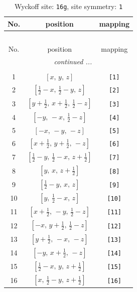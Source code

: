 \documentclass[fleqn,8pt]{jsarticle}
\begin{document}
\begin{longtable}{ccc}
\caption{Wyckoff site: {\tt 16g}, site symmetry: {\tt 1}}
 \\
 \hline \hline
No. & position & mapping \\ \hline \endfirsthead

\multicolumn{2}{l}{\tablename\ \thetable{}} \\
 \hline \hline
No. & position & mapping \\ \hline \endhead

 \hline \hline
\multicolumn{2}{r}{\footnotesize\it continued ...} \\ \endfoot

 \hline \hline
\multicolumn{2}{r}{} \\ \endlastfoot

1 & $\left[ x,\, y,\, z \right]$ & {\tt [1]} \\ \hline
2 & $\left[ \frac{1}{2} - x,\, \frac{1}{2} - y,\, z \right]$ & {\tt [2]} \\ \hline
3 & $\left[ y + \frac{1}{2},\, x + \frac{1}{2},\, \frac{1}{2} - z \right]$ & {\tt [3]} \\ \hline
4 & $\left[ - y,\, - x,\, \frac{1}{2} - z \right]$ & {\tt [4]} \\ \hline
5 & $\left[ - x,\, - y,\, - z \right]$ & {\tt [5]} \\ \hline
6 & $\left[ x + \frac{1}{2},\, y + \frac{1}{2},\, - z \right]$ & {\tt [6]} \\ \hline
7 & $\left[ \frac{1}{2} - y,\, \frac{1}{2} - x,\, z + \frac{1}{2} \right]$ & {\tt [7]} \\ \hline
8 & $\left[ y,\, x,\, z + \frac{1}{2} \right]$ & {\tt [8]} \\ \hline
9 & $\left[ \frac{1}{2} - y,\, x,\, z \right]$ & {\tt [9]} \\ \hline
10 & $\left[ y,\, \frac{1}{2} - x,\, z \right]$ & {\tt [10]} \\ \hline
11 & $\left[ x + \frac{1}{2},\, - y,\, \frac{1}{2} - z \right]$ & {\tt [11]} \\ \hline
12 & $\left[ - x,\, y + \frac{1}{2},\, \frac{1}{2} - z \right]$ & {\tt [12]} \\ \hline
13 & $\left[ y + \frac{1}{2},\, - x,\, - z \right]$ & {\tt [13]} \\ \hline
14 & $\left[ - y,\, x + \frac{1}{2},\, - z \right]$ & {\tt [14]} \\ \hline
15 & $\left[ \frac{1}{2} - x,\, y,\, z + \frac{1}{2} \right]$ & {\tt [15]} \\ \hline
16 & $\left[ x,\, \frac{1}{2} - y,\, z + \frac{1}{2} \right]$ & {\tt [16]} \\
\end{longtable}
\end{document}
